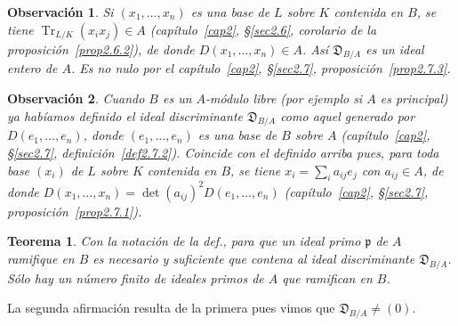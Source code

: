 \documentclass[bibtotoc,leqno,spanish]{amsbook}
\newcommand{\idl}[1]{\mathfrak{#1}}
\newcommand{\disc}{\mathfrak{D}}
\DeclareMathOperator{\Tr}{Tr}
\numberwithin{equation}{section}
\theoremstyle{note}
\theoremstyle{note}
\newtheorem{theorem}{Teorema}
\theoremstyle{rem}
\newtheorem{remark}{Observaci\'on}
\numberwithin{theorem}{section}
\numberwithin{proposition}{section}
\numberwithin{definition}{section}
\numberwithin{lemma}{section}
\numberwithin{corollary}{section}
\numberwithin{example}{section}
\numberwithin{footnote}{section}%
\begin{document}
\begin{remark}
Si $(x_{1},\dots,x_{n})$ es una base de $L$ sobre $K$ contenida en $B$,
se tiene $\Tr_{L/K}(x_{i}x_{j})\in A$ (cap\'itulo~\ref{cap2}, \S\ref{sec2.6}, corolario de la proposici\'on~\ref{prop2.6.2}), de donde
$D(x_{1},\dots,x_{n})\in A$. As\'i $\disc_{B/A}$ es un ideal {\em entero} de $A$. Es {\em no nulo} por
el cap\'itulo~\ref{cap2}, \S\ref{sec2.7}, proposici\'on~\ref{prop2.7.3}.
\end{remark}

\begin{remark}
Cuando $B$ es un $A$-m\'odulo {\em libre} (por ejemplo si $A$ es principal)
ya hab\'iamos definido el ideal discriminante $\disc_{B/A}$ como aquel generado por $D(e_{1},\dots,e_{n})$,
donde $(e_{1},\dots,e_{n})$ es una base de $B$ sobre $A$ (cap\'itulo~\ref{cap2}, \S\ref{sec2.7}, definici\'on~\ref{def2.7.2}). Coincide
con el definido arriba pues, para toda base $(x_{i})$ de $L$ sobre $K$ contenida en $B$, se tiene
$x_{i} = \sum_{i}a_{ij}e_{j}$ con $a_{ij}\in A$, de donde
$D(x_{1},\dots,x_{n}) = \det(a_{ij})^{2}D(e_{1},\dots,e_{n})$
(cap\'itulo~\ref{cap2}, \S\ref{sec2.7}, proposici\'on~\ref{prop2.7.1}).
\end{remark}

\begin{theorem}\label{teo5.3.1}
Con la notaci\'on de la def., para que un ideal primo $\idl{p}$ de $A$ ramifique en $B$ es necesario y
suficiente que contena al ideal discriminante $\disc_{B/A}$. S\'olo hay un n\'umero finito de
ideales primos de $A$ que ramifican en $B$.
\end{theorem}

La segunda afirmaci\'on resulta de la primera pues vimos que $\disc_{B/A}\neq(0)$.
\end{document}
